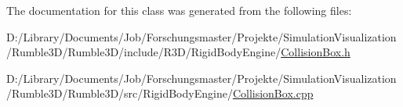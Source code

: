 The documentation for this class was generated from the following files\+:\begin{DoxyCompactItemize}
\item 
D\+:/\+Library/\+Documents/\+Job/\+Forschungsmaster/\+Projekte/\+Simulation\+Visualization/\+Rumble3\+D/\+Rumble3\+D/include/\+R3\+D/\+Rigid\+Body\+Engine/\mbox{\hyperlink{_collision_box_8h}{Collision\+Box.\+h}}\item 
D\+:/\+Library/\+Documents/\+Job/\+Forschungsmaster/\+Projekte/\+Simulation\+Visualization/\+Rumble3\+D/\+Rumble3\+D/src/\+Rigid\+Body\+Engine/\mbox{\hyperlink{_collision_box_8cpp}{Collision\+Box.\+cpp}}\end{DoxyCompactItemize}
